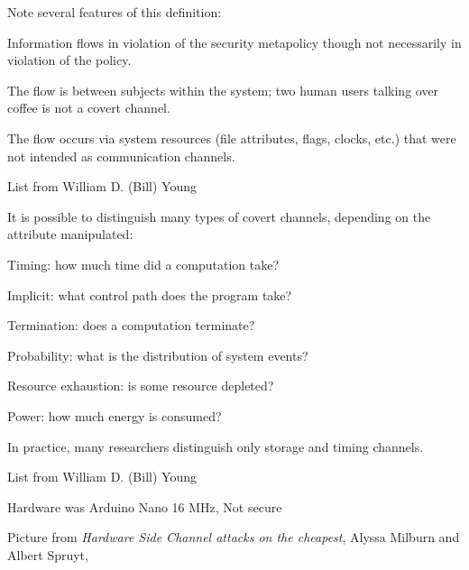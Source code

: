 \documentclass[Screen16to9,17pt]{foils}
\begin{document}
\begin{list1}
\item Note several features of this definition:
\begin{list2}
\item Information flows in violation of the security metapolicy
though not necessarily in violation of the policy.
\item The flow is between subjects within the system; two human
users talking over coffee is not a covert channel.
\item The flow occurs via system resources (file attributes, flags,
clocks, etc.) that were not intended as communication
channels.
\end{list2}
\end{list1}

List from William D. (Bill) Young



\begin{list1}
\item It is possible to distinguish many types of covert channels,
depending on the attribute manipulated:
\begin{list2}
\item Timing: how much time did a computation take?
\item Implicit: what control path does the program take?
\item Termination: does a computation terminate?
\item Probability: what is the distribution of system events?
\item Resource exhaustion: is some resource depleted?
\item Power: how much energy is consumed?
\end{list2}
\item In practice, many researchers distinguish only storage and timing
channels.
\end{list1}

List from William D. (Bill) Young



Hardware was Arduino Nano 16 MHz, Not secure

Picture from
\emph{Hardware Side Channel attacks on the cheapest}, Alyssa Milburn and Albert Spruyt,
\end{document}
